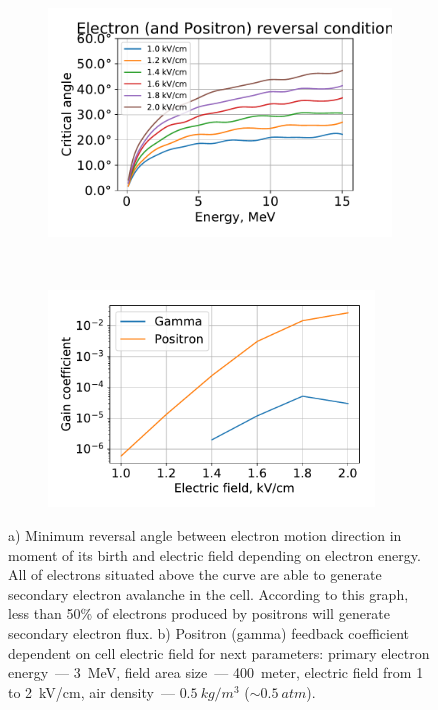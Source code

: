 \documentclass[utf8]{webofc}
\begin{document}
    \begin{figure}[ht!]
        \begin{subfigure}[b]{0.5\textwidth}
            \includegraphics[width=0.95\linewidth]{pictures/09_condition}
            \caption{}
            \label{pic-reverse-b}
        \end{subfigure}
        ~
        \begin{subfigure}[b]{0.5\textwidth}
            \includegraphics[width=0.95\textwidth]{pictures/08_gain}
            
            \caption{}
            \label{pic-gain-a}
        \end{subfigure}
        \caption{     a) Minimum reversal angle between electron motion direction in moment of its birth and electric field depending on electron energy. All of electrons situated above the curve are able to generate secondary electron avalanche in the cell. According to this graph, less than 50\% of electrons produced by positrons will generate secondary electron flux.
            b) Positron (gamma) feedback coefficient dependent on cell electric field for next parameters: primary electron energy~--- 3~MeV, field area size~--- 400~meter, electric field from 1 to 2~kV/cm, air density~--- $0.5~kg/m^3$ ($\sim 0.5~atm$).
        }
    \end{figure}
    
\end{document}
